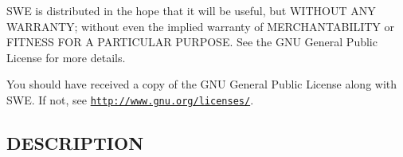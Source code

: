 S\-W\-E is distributed in the hope that it will be useful, but W\-I\-T\-H\-O\-U\-T A\-N\-Y W\-A\-R\-R\-A\-N\-T\-Y; without even the implied warranty of M\-E\-R\-C\-H\-A\-N\-T\-A\-B\-I\-L\-I\-T\-Y or F\-I\-T\-N\-E\-S\-S F\-O\-R A P\-A\-R\-T\-I\-C\-U\-L\-A\-R P\-U\-R\-P\-O\-S\-E. See the G\-N\-U General Public License for more details.

You should have received a copy of the G\-N\-U General Public License along with S\-W\-E. If not, see \href{http://www.gnu.org/licenses/}{\tt http\-://www.\-gnu.\-org/licenses/}.\hypertarget{NetCdfWriter_8hh_DESCRIPTION}{}\subsection{D\-E\-S\-C\-R\-I\-P\-T\-I\-O\-N}\label{NetCdfWriter_8hh_DESCRIPTION}
